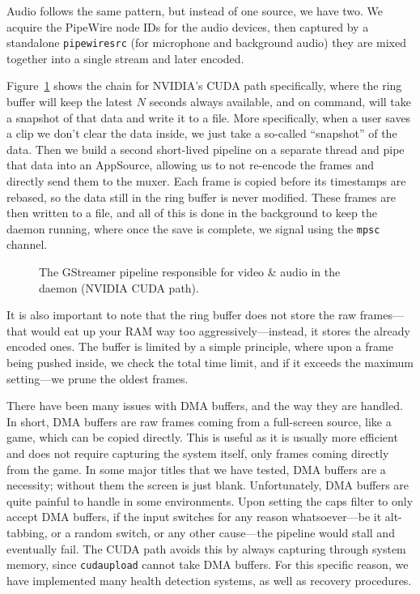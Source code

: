 Audio follows the same pattern, but instead of one source, we have two. We acquire the PipeWire node IDs for the audio devices, then captured by a standalone \lstinline|pipewiresrc| (for microphone and background audio) they are mixed together into a single stream and later encoded.

Figure~\ref{fig:pipeline} shows the chain for NVIDIA's CUDA path specifically, where the ring buffer will keep the latest $N$ seconds always available, and on command, will take a snapshot of that data and write it to a file. More specifically, when a user saves a clip we don't clear the data inside, we just take a so-called ``snapshot'' of the data.
Then we build a second short-lived pipeline on a separate thread and pipe that data into an AppSource, allowing us to not re-encode the frames and directly send them to the muxer. Each frame is copied before its timestamps are rebased, so the data still in the ring buffer is never modified. These frames are then written to a file, and all of this is done in the background to keep the daemon running, where once the save is complete, we signal using the \lstinline|mpsc| channel.

\begin{figure}[htbp]
	\centering
	
	\caption{The GStreamer pipeline responsible for video \& audio in the daemon (NVIDIA CUDA path).}
	\label{fig:pipeline}
\end{figure}


It is also important to note that the ring buffer does not store the raw frames---that would eat up your RAM way too aggressively---instead, it stores the already encoded ones. The buffer is limited by a simple principle, where upon a frame being pushed inside, we check the total time limit, and if it exceeds the maximum setting---we prune the oldest frames.

There have been many issues with DMA buffers, and the way they are handled. In short, DMA buffers are raw frames coming from a full-screen source, like a game, which can be copied directly. This is useful as it is usually more efficient and does not require capturing the system itself, only frames coming directly from the game.
In some major titles that we have tested, DMA buffers are a necessity; without them the screen is just blank. Unfortunately, DMA buffers are quite painful to handle in some environments.
Upon setting the caps filter to only accept DMA buffers, if the input switches for any reason whatsoever---be it alt-tabbing, or a random switch, or any other cause---the pipeline would stall and eventually fail. The CUDA path avoids this by always capturing through system memory, since \lstinline|cudaupload| cannot take DMA buffers. For this specific reason, we have implemented many health detection systems, as well as recovery procedures.

